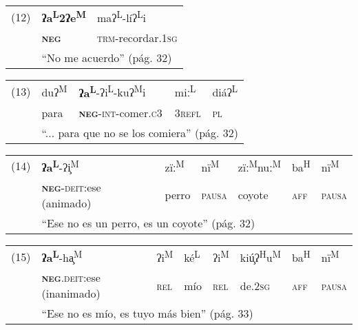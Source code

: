 {\setmainfont{Charis SIL}
    
\begin{tabular}{lll}
(12) & \textbf{ʔa\textsuperscript{L}2ʔe\textsuperscript{M}} & maʔ\textsuperscript{L}-líʔ\textsuperscript{L}i \\
& \textsc{\textbf{neg}} & \textsc{trm}-recordar.\textsc{1sg} \\
& \multicolumn{2}{l}{``No me acuerdo'' (pág. 32)}
\end{tabular} \vspace{0.5cm}

\begin{tabular}{lllll}
(13) & duʔ\textsuperscript{M} &\textbf{ ʔa\textsuperscript{L}}-ʔi\textsuperscript{L}-kuʔ\textsuperscript{M}i & miː\textsuperscript{L} & diáʔ\textsuperscript{L} \\
& para & \textsc{\textbf{neg}}-\textsc{int}-comer.\textsc{c}3 & 3\textsc{refl} & \textsc{pl} \\
& \multicolumn{4}{l}{``... para que no se los comiera'' (pág. 32)}
\end{tabular} \vspace{0.5cm}

\begin{tabular}{lllllll}
(14) & \textbf{ʔa\textsuperscript{L}}-ʔi̧\textsuperscript{M} & zïː\textsuperscript{M} & nï\textsuperscript{M} & zïː\textsuperscript{M}nuː\textsuperscript{M} & ba\textsuperscript{H} & nï\textsuperscript{M} \\
& \textsc{\textbf{neg}-deit}:ese (animado) & perro & \textsc{pausa} & coyote & \textsc{aff} & \textsc{pausa} \\
& \multicolumn{6}{l}{``Ese no es un perro, es un coyote'' (pág. 32)}
\end{tabular} \vspace*{0.5cm}
        
\begin{tabular}{llllllll}
(15) & \textbf{ʔa\textsuperscript{L}}-ha̧\textsuperscript{M}	& ʔi\textsuperscript{M} & ké\textsuperscript{L} & ʔi\textsuperscript{M} & kiú̧ʔ\textsuperscript{H}u\textsuperscript{M} & ba\textsuperscript{H} & nï\textsuperscript{M} \\
& \textsc{\textbf{neg}.deit}:ese (inanimado) & \textsc{rel} & mío & \textsc{rel} & de.\textsc{2sg} & \textsc{aff} & \textsc{pausa} \\
& \multicolumn{7}{l}{``Ese no es mío, es tuyo más bien'' (pág. 33)}	
\end{tabular} \vspace{1cm}

}

